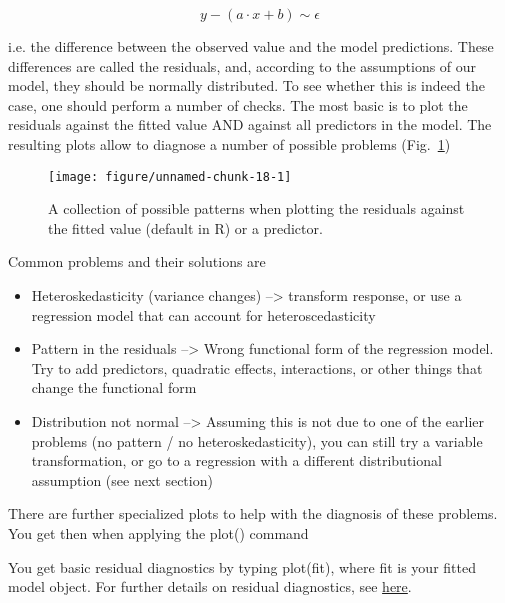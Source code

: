 \documentclass[a4paper,twoside]{tufte-book}\usepackage[]{graphicx}\usepackage[]{color}
\makeatletter
\def\maxwidth{ %
  \ifdim\Gin@nat@width>\linewidth
    \linewidth
  \else
    \Gin@nat@width
  \fi
}
\makeatother
\begin{document}
{\begin{equation} \label{eq: linear regression}
y - (a \cdot x + b ) \sim \epsilon 
\end{equation}

i.e. the difference between the observed value and the model predictions. These differences are called the residuals, and, according to the assumptions of our model, they should be normally distributed. To see whether this is indeed the case, one should perform a number of checks. The most basic is to plot the residuals against the fitted value AND against all predictors in the model. The resulting plots allow to diagnose a number of possible problems (Fig.~\ref{fig: ResidualPatterns})

\begin{figure}[htbp]
\begin{center}
\begin{Schunk}

\texttt{[image: figure/unnamed-chunk-18-1]} \end{Schunk}
\caption{A collection of possible patterns when plotting the residuals against the fitted value (default in R) or a predictor.}
\label{fig: ResidualPatterns}
\end{center}
\end{figure}

Common problems and their solutions are 

\begin{itemize}
  \item Heteroskedasticity (variance changes) --> transform response, or use a regression model that can account for heteroscedasticity
  \item Pattern in the residuals --> Wrong functional form of the regression model. Try to add predictors, quadratic effects, interactions, or other things that change the functional form
  \item Distribution not normal --> Assuming this is not due to one of the earlier problems (no pattern / no heteroskedasticity), you can still try a variable transformation, or go to a regression with a different distributional assumption (see next section)
\end{itemize}  

There are further specialized plots to help with the diagnosis of these problems. You get then when applying the plot() command 


You get basic residual diagnostics by typing plot(fit), where fit is your fitted model object. For further details on residual diagnostics, see \href{http://www.statmethods.net/stats/rdiagnostics.html}{here}.



}
\end{document}
